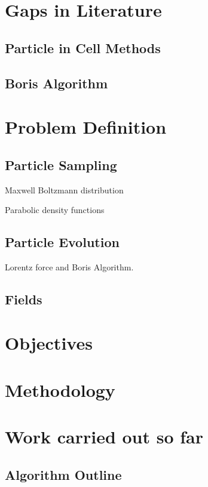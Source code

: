 \documentclass[12pt]{article}
\begin{document}
	\section{Gaps in Literature}
	
	\subsection{Particle in Cell Methods}
	
	\subsection{Boris Algorithm}
	
	\section{Problem Definition}
	
	\subsection{Particle Sampling}
	Maxwell Boltzmann distribution
	
	Parabolic density functions
	
	\subsection{Particle Evolution}
	Lorentz force and Boris Algorithm.
	
	\subsection{Fields}
	
	\section{Objectives}
	
	\section{Methodology}
	
	\section{Work carried out so far}
	
	\subsection{Algorithm Outline}
	
\end{document}
